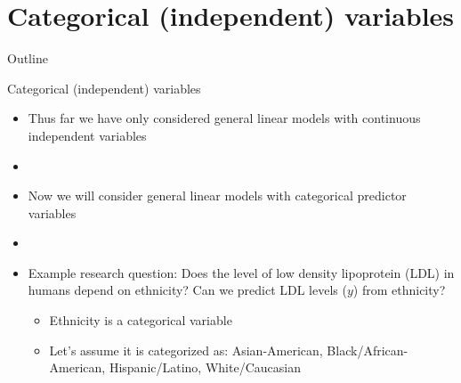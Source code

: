 \documentclass[xcolor=dvipsnames]{beamer}
\begin{document}
\section{Categorical (independent) variables}
\begin{frame}{Outline}
	\tableofcontents[currentsection,subsectionstyle=show/shaded/hide]
\end{frame}

\begin{frame}{Categorical (independent) variables}
	\begin{itemize}
		\item Thus far we have only considered general linear models with continuous independent variables \pause
		\item[]
		\item Now we will consider general linear models with categorical predictor variables \pause
		\item[]
		\item Example research question: Does the level of low density lipoprotein (LDL) in humans depend on ethnicity? Can we predict LDL levels ($y$) from ethnicity? \pause
		\begin{itemize}
			\item Ethnicity is a categorical variable \pause
			\item Let's assume it is categorized as: Asian-American, Black/African-American, Hispanic/Latino, White/Caucasian 
		\end{itemize}
	\end{itemize}
\end{frame}
\end{document}
